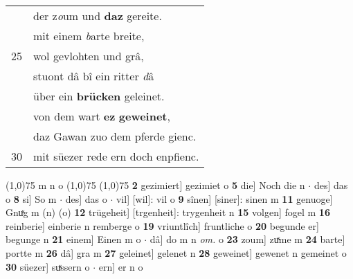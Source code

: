 \documentclass[8pt,a4paper,notitlepage]{article}
\begin{document}
\begin{table}[ht]
\begin{minipage}[t]{0.5\linewidth}
\begin{tabular}{rl}
 & der z\textit{o}um und \textbf{daz} gereite.\\ 
 & mit einem \textit{b}arte breite,\\ 
25 & wol gevlohten und grâ,\\ 
 & stuont dâ bî ein ritter \textit{d}â\\ 
 & über ein \textbf{brücken} geleinet.\\ 
 & von dem wart \textbf{ez} \textbf{geweinet},\\ 
 & daz Gawan zuo dem pferde gienc.\\ 
30 & mit süezer rede ern doch enpfienc.\\ 
\end{tabular}
\scriptsize
\line(1,0){75} \newline
m n o \newline
\line(1,0){75} \newline
\newline
\line(1,0){75} \newline
\textbf{2} gezimiert] gezimiet o \textbf{5} die] Noch die n  $\cdot$ des] das o \textbf{8} si] So m  $\cdot$ des] das o  $\cdot$ vil] [wil]: vil o \textbf{9} sînen] [siner]: sinen m \textbf{11} genuoge] Gnuͯg m (n) (o) \textbf{12} trügeheit] [trgenheit]: trygenheit n \textbf{15} volgen] fogel m \textbf{16} reinberie] einberie n remberge o \textbf{19} vriuntlîch] fruntliche o \textbf{20} begunde er] begunge n \textbf{21} einem] Einen m o  $\cdot$ dâ] do m n \textit{om.} o \textbf{23} zoum] zuͯme m \textbf{24} barte] portte m \textbf{26} dâ] gra m \textbf{27} geleinet] gelenet n \textbf{28} geweinet] gewenet n gemeinet o \textbf{30} süezer] suͯssern o  $\cdot$ ern] er n o \newline
\end{minipage}
\end{table}
\newpage
\end{document}

